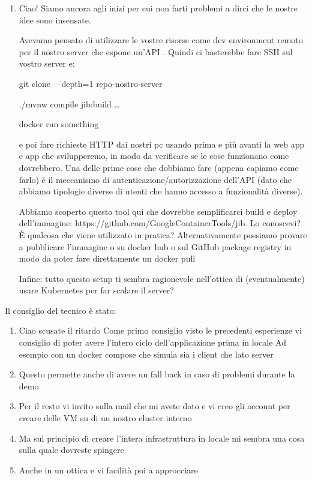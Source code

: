 \documentclass{article}
\begin{document}
\begin{enumerate}
  \item Ciao! Siamo ancora agli inizi per cui non farti problemi a dirci che le nostre idee sono insensate.

  Avevamo pensato di utilizzare le vostre risorse come dev environment remoto per il nostro server  che espone un'API . Quindi ci basterebbe fare SSH sul vostro server e:

  git clone —depth=1 repo-nostro-server

  ./mvnw compile jib:build \ldots %

  docker run something

  e poi fare richieste HTTP dai nostri pc usando prima  e più avanti la web app e app che svilupperemo, in modo da verificare se le cose funzionano come dovrebbero.
  Una delle prime cose che dobbiamo fare (appena capiamo come farlo) è il meccanismo di autenticazione/autorizzazione dell'API (dato che abbiamo tipologie diverse di utenti che hanno accesso a funzionalità diverse).

  Abbiamo scoperto questo tool qui che dovrebbe semplificarci build e deploy dell'immagine: https://github.com/GoogleContainerTools/jib. Lo conoscevi? È qualcosa che viene utilizzato in pratica?  %
  Alternativamente possiamo provare a pubblicare l'immagine o su docker hub o sul GitHub package registry in modo da poter fare direttamente un docker pull

  Infine: tutto questo setup ti sembra ragionevole nell'ottica di (eventualmente) usare Kubernetes per far scalare il server?
\end{enumerate}

Il consiglio del tecnico è stato:

\begin{enumerate}
  \item Ciao scusate il ritardo
  Come primo consiglio visto le precedenti esperienze vi consiglio di poter avere l'intero ciclo dell'applicazione prima in locale
  Ad esempio con un docker compose che simula sia i client che lato server
  \item Questo permette anche di avere un fall back in caso di problemi durante la demo
  \item Per il resto vi invito sulla mail che mi avete dato e vi creo gli account per creare delle VM su di un nostro cluster interno
  \item Ma sul principio di creare l'intera infrastruttura in locale mi sembra una cosa sulla quale dovreste spingere
  \item Anche in un ottica  e vi facilità poi a approcciare 
\end{enumerate}
\end{document}
